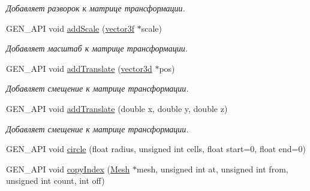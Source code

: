 \begin{DoxyCompactItemize}
\begin{DoxyCompactList}\small\item\em Добавляет разворок к матрице трансформации. \end{DoxyCompactList}\item 
\hypertarget{classgen_1_1_modeller_mesh_abb4141f0cd7f98804b36a888fa71595c}{G\-E\-N\-\_\-\-A\-P\-I void \hyperlink{classgen_1_1_modeller_mesh_abb4141f0cd7f98804b36a888fa71595c}{add\-Scale} (\hyperlink{classbt_1_1vector3f}{vector3f} $\ast$scale)}\label{classgen_1_1_modeller_mesh_abb4141f0cd7f98804b36a888fa71595c}

\begin{DoxyCompactList}\small\item\em Добавляет масштаб к матрице трансформации. \end{DoxyCompactList}\item 
\hypertarget{classgen_1_1_modeller_mesh_a5c922811fe3de16a4271eb2fe3ae7307}{G\-E\-N\-\_\-\-A\-P\-I void \hyperlink{classgen_1_1_modeller_mesh_a5c922811fe3de16a4271eb2fe3ae7307}{add\-Translate} (\hyperlink{classbt_1_1vector3d}{vector3d} $\ast$pos)}\label{classgen_1_1_modeller_mesh_a5c922811fe3de16a4271eb2fe3ae7307}

\begin{DoxyCompactList}\small\item\em Добавляет смещение к матрице трансформации. \end{DoxyCompactList}\item 
\hypertarget{classgen_1_1_modeller_mesh_a7e58ea4100de31965e707c65045b1684}{G\-E\-N\-\_\-\-A\-P\-I void \hyperlink{classgen_1_1_modeller_mesh_a7e58ea4100de31965e707c65045b1684}{add\-Translate} (double x, double y, double z)}\label{classgen_1_1_modeller_mesh_a7e58ea4100de31965e707c65045b1684}

\begin{DoxyCompactList}\small\item\em Добавляет смещение к матрице трансформации. \end{DoxyCompactList}\item 
G\-E\-N\-\_\-\-A\-P\-I void \hyperlink{classgen_1_1_modeller_mesh_a5a706b85444623b8ec0e82f8e84492be}{circle} (float radius, unsigned int cells, float start=0, float end=0)
\item 
\hypertarget{classgen_1_1_modeller_mesh_a735911c67efd79e24f1eaa04e1a320e9}{G\-E\-N\-\_\-\-A\-P\-I void \hyperlink{classgen_1_1_modeller_mesh_a735911c67efd79e24f1eaa04e1a320e9}{copy\-Index} (\hyperlink{classcsad_1_1_mesh}{Mesh} $\ast$mesh, unsigned int at, unsigned int from, unsigned int count, int off)}\label{classgen_1_1_modeller_mesh_a735911c67efd79e24f1eaa04e1a320e9}


\end{DoxyCompactItemize}
